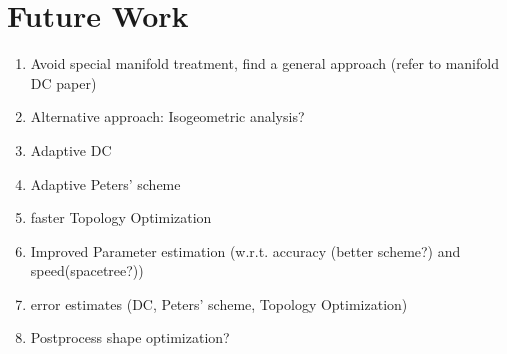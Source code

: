 \section{Future Work}
\label{sec:Future}
\begin{enumerate}
\item Avoid special manifold treatment, find a general approach (refer to manifold DC paper)
\item Alternative approach: Isogeometric analysis?
\item Adaptive DC
\item Adaptive Peters' scheme
\item faster Topology Optimization
\item Improved Parameter estimation (w.r.t. accuracy (better scheme?) and speed(spacetree?))
\item error estimates (DC, Peters' scheme, Topology Optimization)
\item Postprocess shape optimization?
\end{enumerate}

